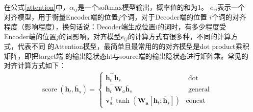 在公式\eqref{attention}中，$\alpha_{ij}$是一个softmax模型输出，概率值的和为1。%
$e_{i j}$表示一个对齐模型，用于衡量Encoder端的位置$j$个词，对于Decoder端的位置%
$i$个词的对齐程度（影响程度），换句话说：Decoder端生成位置i的词时，有多少程度受%
Encoder端的位置$j$的词影响。对齐模型$e_{i j}$的计算方式有很多种，不同的计算方式，代表不同%
的Attention模型，最简单且最常用的的对齐模型是dot product乘积矩阵，即把target端%
的输出隐状态ht与source端的输出隐状态进行矩阵乘。常见的对齐计算方式如下：
\begin{align}
\operatorname{score}\left(\boldsymbol{h}_{t}, \overline{\boldsymbol{h}}_{s}\right)=
\left\{
  \begin{array}{ll}{\boldsymbol{h}_{t}^{\top} \overline{\boldsymbol{h}}_{s}} & {\text { dot }} \\ {\boldsymbol{h}_{t}^{\top} \boldsymbol{W}_{a} \overline{\boldsymbol{h}}_{s}} & {\text { general }} \\ {\boldsymbol{v}_{a}^{\top} \tanh \left(\boldsymbol{W}_{\boldsymbol{a}}\left[\boldsymbol{h}_{t} ; \overline{\boldsymbol{h}}_{s}\right]\right)} & {\text {concat}}
  \end{array}
\right.
\end{align} 



